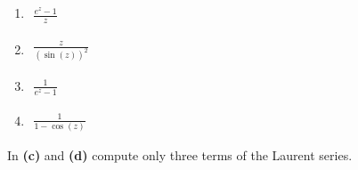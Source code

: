 \documentclass[11pt]{article}
\begin{document}
\begin{enumerate}[label=\textbf{(\alph*)}]
    \item
          \begin{flushleft}
              $\begin{aligned}
                      \frac{e^{z}-1}{z}
                  \end{aligned}$
          \end{flushleft}
    \item
          \begin{flushleft}
              $\begin{aligned}
                      \frac{z}{(\sin(z))^{2}}
                  \end{aligned}$
          \end{flushleft}
    \item
          \begin{flushleft}
              $\begin{aligned}
                      \frac{1}{e^{z}-1}
                  \end{aligned}$
          \end{flushleft}
    \item
          \begin{flushleft}
              $\begin{aligned}
                      \frac{1}{1-\cos(z)}
                  \end{aligned}$
          \end{flushleft}
\end{enumerate}
In \textbf{(c)} and \textbf{(d)} compute only three terms of the Laurent series.
\end{document}
